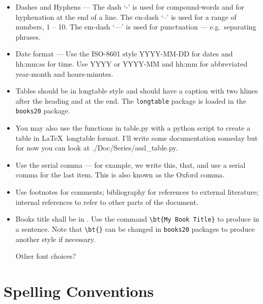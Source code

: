 
\begin{itemize}

\item Dashes and Hyphens --- The dash `-' is used for compound-words and for
  hyphenation at the end of a line.  The en-dash `--' is used for a range
  of numbers, 1 -- 10. The em-dash `---' is used for punctuation ---
  e.g.\ separating phrases.

\item Date format --- Use the ISO-8601 \cite{isotime} style
  YYYY-MM-DD for dates and hh:mm:ss for time. Use YYYY or YYYY-MM
  and hh:mm for abbreviated year-month and hours-minutes.

\item Tables should be in longtable style and should have a caption
  with two hlines after the heading and at the end. The
  \texttt{longtable} \cite{Carlisle2014} package is loaded in the \texttt{books20}
  package.

\item You may also use the functions in table.py with a python script to create
  a table in \LaTeX\ longtable format.  I'll write some documentation someday
  but for now you can look at ./Doc/Series/assl\_table.py.

\item Use the serial comma --- for example, we write this, that, and
  use a serial comma for the last item. This is also known as the Oxford
  comma.

\item Use footnotes for comments; bibliography for references to
  external literature; internal references to refer to other parts of
  the document.

\item Books title shall be in . Use the command
  \verb|\bt{My Book Title}| to produce  in a
  sentence. Note that \verb|\bt{}| can be changed in \texttt{books20}
  packages to produce another style if necessary.

 Other font choices?

\end{itemize}

\section{Spelling Conventions}

